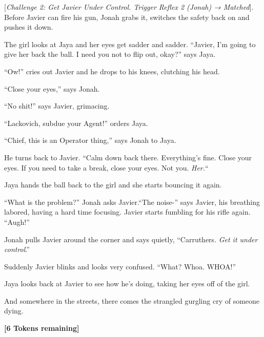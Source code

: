 {[}\textit{Challenge 2: Get Javier Under Control.  Trigger Reflex 2 (Jonah) → Matched}{]}. Before Javier can fire his gun, Jonah grabs it, switches the safety back on and pushes it down. 

The girl looks at Jaya and her eyes get sadder and sadder.  ``Javier, I'm going to give her back the ball.  I need you not to flip out, okay?'' says Jaya.

``Ow!'' cries out Javier and he drops to his knees, clutching his head.

``Close your eyes,'' says Jonah.

``No shit!'' says Javier, grimacing.

``Lackovich, subdue your Agent!'' orders Jaya.

``Chief, this is an Operator thing,'' says Jonah to Jaya.

He turns back to Javier.  ``Calm down back there.  Everything's fine.  Close your eyes.  If you need to take a break, close your eyes.  Not you.  \textit{Her.}``  

Jaya hands the ball back to the girl and she starts bouncing it again.

``What is the problem?'' Jonah asks Javier.``The noise-'' says Javier, his breathing labored, having a hard time focusing.  Javier starts fumbling for his rifle again. ``Augh!''

Jonah pulls Javier around the corner and says quietly, ``Carruthers.  \textit{Get it under control}.''

Suddenly Javier blinks and looks very confused.  ``What?  Whoa.  WHOA!''

Jaya looks back at Javier to see how he's doing, taking her eyes off of the girl.



And somewhere in the streets, there comes the strangled gurgling cry of someone dying.





\textbf{{[}6 Tokens remaining{]}}









